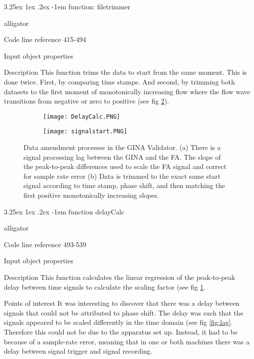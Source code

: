 \documentclass[12pt, openany, oneside]{book}
\makeatletter
\renewcommand\subparagraph{\@startsection{subparagraph}{6}{\parindent}%
  {3.25ex \@plus1ex \@minus .2ex}%
  {-1em}%
  {\normalfont\normalsize\bfseries}}
\makeatother
\begin{document}
\subparagraph{function: filetrimmer}
\begin{labeling}{alligator}
\item[Code line reference] 415-494
\item[Input]object properties
\item[Description] This function trims the data to start from the same moment. This is done twice. First, by comparing time stamps. And second, by trimming both datasets to the first moment of monotonically increasing flow where the flow wave transitions from negative or zero to positive (see fig \ref{fig:delay}).
\end{labeling}

\begin{figure}
\centering

		
	\begin{subfigure}{.99\textwidth}	
		\texttt{[image: DelayCalc.PNG]}		
		\caption{}
		\label{fig:trim}
	\end{subfigure}
	
	\begin{subfigure}{.99\textwidth}
		\texttt{[image: signalstart.PNG]}		
		\caption{}
		\label{fig:delay}
	\end{subfigure}
	
	\caption[Data amendments in the GINA Validator]{Data amendment processes in the GINA Validator. (a) There is a signal processing lag between the GINA and the FA. The slope of the peak-to-peak differences used to scale the FA signal and correct for sample rate error  (b) Data is trimmed to the exact same start signal according to time stamp, phase shift, and then matching the first positive monotonically increasing slopes.} 

\label{fig:calcs}

\end{figure}

\subparagraph{function delayCalc}
\begin{labeling}{alligator}
\item[Code line reference] 493-539
\item[Input]object properties
\item[Description] This function calculates the linear regression of the peak-to-peak delay between time signals to calculate the scaling factor (see fig \ref{fig:trim}.
\item[Points of interest] It was interesting to discover that there was a delay between signals that could not be attributed to phase shift. The delay was such that the signals appeared to be scaled differently in the time domain (see fig \ref{fig:lag}. Therefore this could not be due to the apparatus set up. Instead, it had to be because of a sample-rate error, meaning that in one or both machines there was a delay between signal trigger and signal recording. 
\end{labeling}
\end{document}
